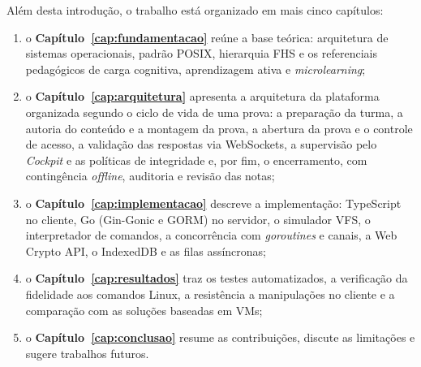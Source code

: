 Além desta introdução, o trabalho está organizado em mais cinco capítulos:
\begin{enumerate}
    \item o \textbf{Capítulo~\ref{cap:fundamentacao}} reúne a base teórica: arquitetura de sistemas operacionais, padrão POSIX, hierarquia FHS e os referenciais pedagógicos de carga cognitiva, aprendizagem ativa e \textit{microlearning};
    \item o \textbf{Capítulo~\ref{cap:arquitetura}} apresenta a arquitetura da plataforma organizada segundo o ciclo de vida de uma prova: a preparação da turma, a autoria do conteúdo e a montagem da prova, a abertura da prova e o controle de acesso, a validação das respostas via WebSockets, a supervisão pelo \textit{Cockpit} e as políticas de integridade e, por fim, o encerramento, com contingência \textit{offline}, auditoria e revisão das notas;
    \item o \textbf{Capítulo~\ref{cap:implementacao}} descreve a implementação: TypeScript no cliente, Go (Gin-Gonic e GORM) no servidor, o simulador VFS, o interpretador de comandos, a concorrência com \textit{goroutines} e canais, a Web Crypto API, o IndexedDB e as filas assíncronas;
    \item o \textbf{Capítulo~\ref{cap:resultados}} traz os testes automatizados, a verificação da fidelidade aos comandos Linux, a resistência a manipulações no cliente e a comparação com as soluções baseadas em VMs;
    \item o \textbf{Capítulo~\ref{cap:conclusao}} resume as contribuições, discute as limitações e sugere trabalhos futuros.
\end{enumerate}
